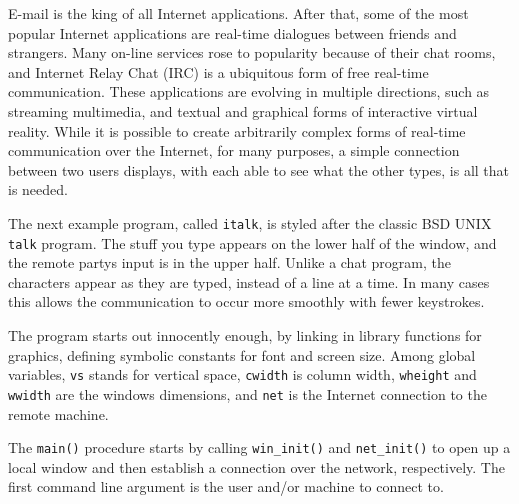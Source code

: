 E-mail is the king of all Internet applications. After that, some of the
most popular Internet applications are real-time dialogues between
friends and strangers. Many on-line services rose to popularity because
of their {\textquotedbl}chat rooms,{\textquotedbl} and Internet Relay
Chat (IRC) is a ubiquitous form of free real-time
communication. These applications are evolving in multiple directions,
such as streaming multimedia, and textual and graphical forms of
interactive virtual reality. While it is possible to create arbitrarily
complex forms of real-time communication over the Internet, for many
purposes, a simple connection between two users{\textquotesingle}
displays, with each able to see what the other types, is all that is
needed.

The next example program, called \texttt{italk}, is styled after the
classic BSD UNIX \texttt{talk} program. The stuff you type
appears on the lower half of the window, and the remote
party{\textquotesingle}s input is in the upper half. Unlike a chat
program, the characters appear as they are typed, instead of a line at
a time. In many cases this allows the communication to occur more
smoothly with fewer keystrokes.

The program starts out innocently enough, by linking in library
functions for graphics, defining symbolic constants for font and screen
size. Among global variables, \texttt{vs} stands for vertical space,
\texttt{cwidth} is column width, \texttt{wheight} and \texttt{wwidth}
are the window{\textquotesingle}s dimensions, and \texttt{net} is the
Internet connection to the remote machine.


The \texttt{main()} procedure starts by calling \texttt{win\_init()} and
\texttt{net\_init()} to open up a local window and then establish a
connection over the network, respectively. The first command line
argument is the user and/or machine to connect to.

